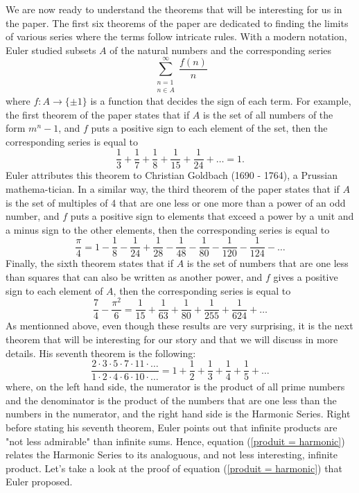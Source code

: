 We are now ready to understand the theorems that will be interesting for us in the paper. The first six theorems of the paper are dedicated to finding the limits of various series where the terms follow intricate rules. With a modern notation, Euler studied subsets $A$ of the natural numbers and the corresponding series
$$\sum_{\substack{n=1 \\ n \in A}}^{\infty}\frac{f(n)}{n}$$
where $f: A \to \{\pm 1\}$ is a function that decides the sign of each term. For example, the first theorem of the paper states that if $A$ is the set of all numbers of the form $m^n - 1$, and $f$ puts a positive sign to each element of the set, then the corresponding series is equal to
$$\frac{1}{3} + \frac{1}{7} + \frac{1}{8} + \frac{1}{15} + \frac{1}{24} + \dots = 1.$$
Euler attributes this theorem to Christian Goldbach (1690 - 1764), a Prussian mathema-tician. In a similar way, the third theorem of the paper states that if $A$ is the set of multiples of 4 that are one less or one more than a power of an odd number, and $f$ puts a positive sign to elements that exceed a power by a unit and a minus sign to the other elements, then the corresponding series is equal to
$$\frac{\pi}{4} = 1 - \frac{1}{8} - \frac{1}{24} + \frac{1}{28} - \frac{1}{48} - \frac{1}{80} - \frac{1}{120} - \frac{1}{124} - \dots$$
Finally, the sixth theorem states that if $A$ is the set of numbers that are one less than squares that can also be written as another power, and $f$ gives a positive sign to each element of $A$, then the corresponding series is equal to
$$\frac{7}{4} - \frac{\pi^2}{6} = \frac{1}{15} + \frac{1}{63} + \frac{1}{80} + \frac{1}{255} + \frac{1}{624} + \dots$$
As mentionned above, even though these results are very surprising, it is the next theorem that will be interesting for our story and that we will discuss in more details. His seventh theorem is the following:
\begin{equation} \label{produit = harmonic}
    \frac{2\cdot 3 \cdot 5 \cdot 7 \cdot 11 \cdot \dots}{1\cdot 2 \cdot 4 \cdot 6 \cdot 10 \cdot \dots} = 1 + \frac{1}{2} + \frac{1}{3} + \frac{1}{4} + \frac{1}{5} + \dots
\end{equation}
where, on the left hand side, the numerator is the product of all prime numbers and the denominator is the product of the numbers that are one less than the numbers in the numerator, and the right hand side is the Harmonic Series. Right before stating his seventh theorem, Euler points out that infinite products are "not less admirable" than infinite sums. Hence, equation (\ref{produit = harmonic}) relates the Harmonic Series to its analoguous, and not less interesting, infinite product. Let's take a look at the proof of equation (\ref{produit = harmonic}) that Euler proposed.

